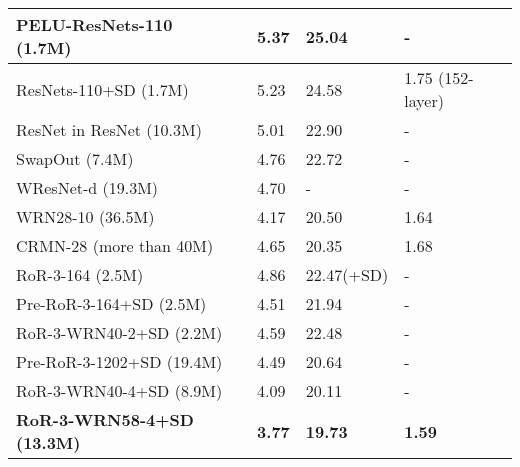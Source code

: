 \documentclass[journal]{IEEEtran}
\begin{document}
\begin{table}[!t]
\begin{tabular}{|p{3.5cm}|p{1.2cm}|p{1.2cm}|p{1.2cm}|}
PELU-ResNets-110 (1.7M)~\cite{trottier2016pelu}       &5.37                 &25.04          &-               \\\hline
ResNets-110+SD (1.7M)~\cite{huang2016SD}         &5.23                 &24.58          &1.75 (152-layer)               \\\hline
ResNet in ResNet (10.3M)~\cite{targ2016rir}      &5.01                 &22.90          &-               \\\hline
SwapOut (7.4M)~\cite{singh2016swapout}                &4.76                 &22.72          &-               \\\hline
WResNet-d (19.3M)~\cite{shen2016wresnets}             &4.70                 &-              &-               \\\hline
WRN28-10 (36.5M)~\cite{zagoruyko2016wrn}              &4.17                 &20.50          &1.64               \\\hline
CRMN-28 (more than 40M)~\cite{moniz2016crmn}       &4.65                 &20.35          &1.68              \\\hline\hline
RoR-3-164 (2.5M)              &4.86                 &22.47(+SD)          &-               \\\hline
Pre-RoR-3-164+SD (2.5M)          &4.51                 &21.94          &-               \\\hline
RoR-3-WRN40-2+SD (2.2M)          &4.59                 &22.48          &-               \\\hline
Pre-RoR-3-1202+SD (19.4M)        &4.49                 &20.64          &-               \\\hline
RoR-3-WRN40-4+SD (8.9M)          &4.09                 &20.11          &-               \\\hline
\textbf{RoR-3-WRN58-4+SD (13.3M)}         &\textbf{3.77}                 &\textbf{19.73}          &\textbf{1.59}               \\\hline



\end{tabular}
\end{table}
\end{document}
